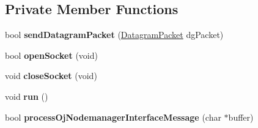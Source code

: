 \subsection*{\-Private \-Member \-Functions}
\begin{DoxyCompactItemize}
\item 
\hypertarget{class_oj_udp_component_interface_a0dad00af6b341669a80d5877c4f7224c}{bool {\bfseries send\-Datagram\-Packet} (\hyperlink{struct_datagram_packet_struct}{\-Datagram\-Packet} dg\-Packet)}\label{class_oj_udp_component_interface_a0dad00af6b341669a80d5877c4f7224c}

\item 
\hypertarget{class_oj_udp_component_interface_aabb1d9644b5a75747d141aa64db1ba94}{bool {\bfseries open\-Socket} (void)}\label{class_oj_udp_component_interface_aabb1d9644b5a75747d141aa64db1ba94}

\item 
\hypertarget{class_oj_udp_component_interface_a4ea2b94d5ff886be24b593eca354a3a6}{void {\bfseries close\-Socket} (void)}\label{class_oj_udp_component_interface_a4ea2b94d5ff886be24b593eca354a3a6}

\item 
\hypertarget{class_oj_udp_component_interface_a91df0d71698debfc0ebdecccff9a9636}{void {\bfseries run} ()}\label{class_oj_udp_component_interface_a91df0d71698debfc0ebdecccff9a9636}

\item 
\hypertarget{class_oj_udp_component_interface_a71079ab217f5102967f44dc4c4a6fce0}{bool {\bfseries process\-Oj\-Nodemanager\-Interface\-Message} (char $\ast$buffer)}\label{class_oj_udp_component_interface_a71079ab217f5102967f44dc4c4a6fce0}

\end{DoxyCompactItemize}

